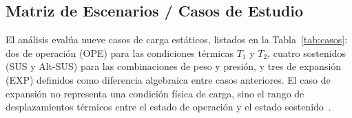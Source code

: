 \subsection{Matriz de Escenarios / Casos de Estudio}

El an\'{a}lisis eval\'{u}a nueve casos de carga est\'{a}ticos, listados en la
Tabla~\ref{tab:casos}: dos de operaci\'{o}n (OPE) para las condiciones
t\'{e}rmicas $T_1$ y $T_2$, cuatro sostenidos (SUS y Alt-SUS) para las
combinaciones de peso y presi\'{o}n, y tres de expansi\'{o}n (EXP) definidos como
diferencia algebraica entre casos anteriores. El caso de expansi\'{o}n no
representa una condici\'{o}n f\'{i}sica de carga, sino el rango de
desplazamientos t\'{e}rmicos entre el estado de operaci\'{o}n y el estado
sostenido~\cite{whatispiping_pipe_stress}.


